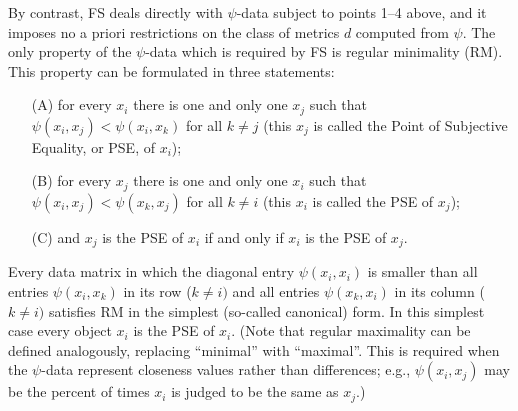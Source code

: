 \documentclass[nojss]{jss}
\begin{document}
By contrast, FS deals directly with $\psi$-data subject to points
1--4 above, and it imposes no a priori restrictions on the class of
metrics $d$ computed from $\psi$. The only property of the $\psi$-data
which is required by FS is regular minimality (RM).
This property can be formulated in three statements:
\begin{itemize}
\item [(A)] for every $x_{i}$ there is one and only one $x_{j}$ such
that $\psi\left(x_{i},x_{j}\right)<\psi\left(x_{i},x_{k}\right)$
for all $k\neq j$ (this $x_{j}$ is called the Point of Subjective
Equality, or PSE, of $x_{i}$);
\item [(B)] for every $x_{j}$ there is one and only one $x_{i}$ such
that $\psi\left(x_{i},x_{j}\right)<\psi\left(x_{k},x_{j}\right)$
for all $k\neq i$ (this $x_{i}$ is called the PSE of $x_{j}$);
\item [(C)] and $x_{j}$ is the PSE of $x_{i}$ if and only if $x_{i}$
is the PSE of $x_{j}$.
\end{itemize}
Every data matrix in which the diagonal entry $\psi\left(x_{i},x_{i}\right)$
is smaller than all entries $\psi\left(x_{i},x_{k}\right)$ in its
row ($k\neq i)$ and all entries $\psi\left(x_{k},x_{i}\right)$ in
its column ($k\neq i)$ satisfies RM in the simplest (so-called canonical) form. 
In this simplest case every object $x_{i}$ is the PSE of $x_{i}$. 
(Note that regular maximality can be defined analogously, 
replacing ``minimal'' with ``maximal''.
This is required when the $\psi$-data represent closeness values rather than differences; e.g., 
$\psi\left(x_{i},x_{j}\right)$ may be the percent of times $x_{i}$ is judged to be the same as 
$x_{j}$.)
\end{document}

